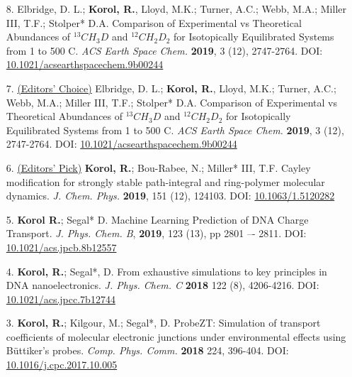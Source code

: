 \begin{enumerate}
	\item[8.] Elbridge, D. L.; \textbf{Korol, R.}, Lloyd, M.K.; Turner, A.C.; Webb, M.A.; Miller III, T.F.; Stolper* D.A.
Comparison of Experimental vs Theoretical Abundances of $^{13}CH_3D$ and $^{12}CH_2D_2$ for Isotopically Equilibrated Systems from 1 to 500 \degree C. \textit{ACS Earth Space Chem.} \textbf{2019}, 3 (12), 2747-2764. DOI: \href{https://pubs.acs.org/doi/10.1021/acsearthspacechem.9b00244}{10.1021/acsearthspacechem.9b00244}
\vspace{0.1cm}

	\item[7.] \underline{(Editors' Choice)} Elbridge, D. L.; \textbf{Korol, R.}, Lloyd, M.K.; Turner, A.C.; Webb, M.A.; Miller III, T.F.; Stolper* D.A.
Comparison of Experimental vs Theoretical Abundances of $^{13}CH_3D$ and $^{12}CH_2D_2$ for Isotopically Equilibrated Systems from 1 to 500 \degree C. \textit{ACS Earth Space Chem.} \textbf{2019}, 3 (12), 2747-2764. DOI: \href{https://pubs.acs.org/doi/10.1021/acsearthspacechem.9b00244}{10.1021/acsearthspacechem.9b00244}
\vspace{0.1cm}

	\item[6.] \underline{(Editors' Pick)} \textbf{Korol, R.}; Bou-Rabee,  N.; Miller* III, T.F. Cayley modification for strongly stable path-integral and ring-polymer molecular dynamics. \textit{J. Chem. Phys.} \textbf{2019}, 151 (12), 124103. DOI: \href{https://aip.scitation.org/doi/10.1063/1.5120282}{10.1063/1.5120282}
\vspace{0.1cm}

	\item[5.] \textbf{Korol R.}; Segal* D. Machine Learning Prediction of DNA Charge Transport. \textit{J. Phys. Chem. B}, \textbf{2019}, 123 (13), pp 2801 –- 2811. DOI: \href{https://pubs.acs.org/doi/full/10.1021/acs.jpcb.8b12557}{10.1021/acs.jpcb.8b12557}
\vspace{0.1cm}
	
	\item[4.] \textbf{Korol, R.}; Segal*, D. From exhaustive simulations to key principles in DNA nanoelectronics. \textit{J. Phys. Chem. C} \textbf{2018} 122 (8), 4206-4216. DOI: \href{https://pubs.acs.org/doi/abs/10.1021/acs.jpcc.7b12744}{10.1021/acs.jpcc.7b12744}
\vspace{0.1cm}

	\item[3.] \textbf{Korol, R.}; Kilgour,  M.; Segal*, D. ProbeZT: Simulation of transport coefficients of molecular electronic junctions under environmental effects using B\"uttiker’s probes. \textit{Comp. Phys. Comm.} \textbf{2018} 224, 396-404. DOI: \href{https://doi.org/10.1016/j.cpc.2017.10.005}{10.1016/j.cpc.2017.10.005}
\vspace{0.1cm}


\end{enumerate}

